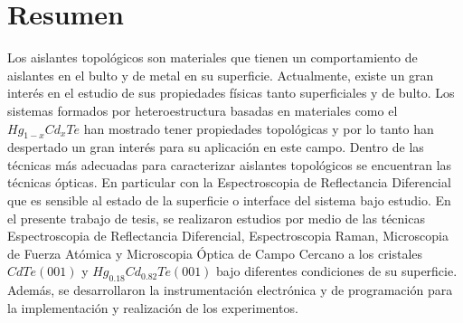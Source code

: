 \chapter{Resumen}
\label{chap:abstract}

Los aislantes topológicos son materiales que tienen un comportamiento de aislantes en el bulto y 
de metal en su superficie. Actualmente, existe un gran interés en el estudio de sus propiedades 
físicas tanto superficiales y de bulto. Los sistemas formados por heteroestructura basadas en 
materiales como el $ Hg_{1-x}Cd_{x}Te $ han mostrado tener propiedades topológicas y por lo tanto 
han despertado un gran interés para su aplicación en este campo. Dentro de las técnicas más 
adecuadas para caracterizar aislantes topológicos se encuentran las técnicas ópticas. En 
particular con la Espectroscopia de Reflectancia Diferencial que es sensible al estado de la 
superficie o interface del sistema bajo estudio. En el presente trabajo de tesis, se realizaron 
estudios por medio de las técnicas Espectroscopia de Reflectancia Diferencial, Espectroscopia 
Raman, Microscopia de Fuerza Atómica y Microscopia Óptica de Campo Cercano a los cristales 
$ CdTe (001) $ y $ Hg_{0.18}Cd_{0.82}Te (001)$ bajo diferentes condiciones de su superficie. 
Además, se desarrollaron la instrumentación electrónica y de programación 
para la implementación y realización de los experimentos.